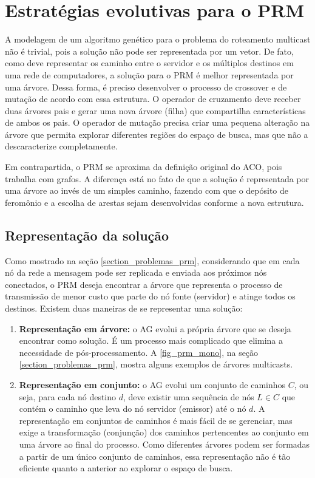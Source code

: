 \chapter[Estratégias evolutivas para o PRM]{Estratégias evolutivas para o PRM}

A modelagem de um algoritmo genético para o problema do roteamento multicast não é trivial, pois a solução não pode ser representada por um vetor. De fato, como deve representar os caminho entre o servidor e os múltiplos destinos em uma rede de computadores, a solução para o PRM é melhor representada por uma árvore. Dessa forma, é preciso desenvolver o processo de crossover e de mutação de acordo com essa estrutura. O operador de cruzamento deve receber duas árvores pais e gerar uma nova árvore (filha) que compartilha características de ambos os pais. O operador de mutação precisa criar uma pequena alteração na árvore que permita explorar diferentes regiões do espaço de busca, mas que não a descaracterize completamente.

Em contrapartida, o PRM se aproxima da definição original do ACO, pois trabalha com grafos. A diferença está no fato de que a solução é representada por uma árvore ao invés de um simples caminho, fazendo com que o depósito de feromônio e a escolha de arestas sejam desenvolvidas conforme a nova estrutura.

\section{Representação da solução}

Como mostrado na seção \ref{section_problemas_prm}, considerando que em cada nó da rede a mensagem pode ser replicada e enviada aos próximos nós conectados, o PRM deseja encontrar a árvore que representa o processo de transmissão de menor custo que parte do nó fonte (servidor) e atinge todos os destinos. Existem duas maneiras de se representar uma solução:

\begin{enumerate}
	\item \textbf{Representação em árvore:} \cite{Bueno2010} o AG evolui a própria árvore que se deseja encontrar como solução. É um processo mais complicado que elimina a necessidade de pós-processamento. A \autoref{fig_prm_mono}, na seção \ref{section_problemas_prm}, mostra alguns exemplos de árvores multicasts.
	\item \textbf{Representação em conjunto:} \cite{Baran2004} o AG evolui um conjunto de caminhos $C$, ou seja, para cada nó destino $d$, deve existir uma sequência de nós $L \in C$ que contém o caminho que leva do nó servidor (emissor) até o nó $d$. A representação em conjuntos de caminhos é mais fácil de se gerenciar, mas exige a transformação (conjunção) dos caminhos pertencentes ao conjunto em uma árvore  ao final do processo. Como diferentes árvores podem ser formadas a partir de um único conjunto de caminhos, essa representação não é tão eficiente quanto a anterior ao explorar o espaço de busca.
\end{enumerate}

